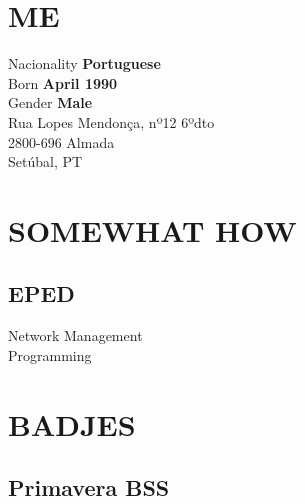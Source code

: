 \documentclass[letterpaper]{deedy-resume} %
\begin{document}

\lastupdated %



\begin{minipage}[t]{0.33\textwidth}

\section{ME}

Nacionality \textbf{Portuguese}\\
Born \textbf{April 1990}\\
Gender \textbf{Male}\\

Rua Lopes Mendonça, nº12 6ºdto\\
2800-696 Almada\\
Setúbal, PT\\

\sectionspace

\section{SOMEWHAT HOW}
\subsection{EPED}
Network Management\\
Programming

\sectionspace

\section{BADJES}
\subsection{Primavera BSS}

\end{minipage}
\end{document}
